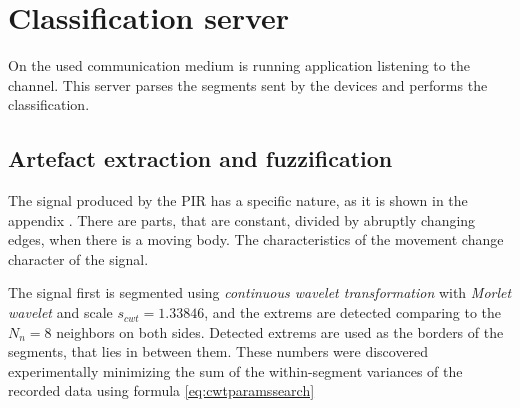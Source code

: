 



\section{Classification server}
On the used communication medium is running application listening to the channel.
This server parses the segments sent by the devices and performs the classification.


\subsection*{Artefact extraction and fuzzification}
The signal produced by the PIR has a specific nature, as it is shown in the appendix \label{appendix:PIRSignal}.
There are parts, that are constant, divided by abruptly changing edges, when there is a moving body. The
characteristics of the movement change character of the signal.

The signal first is segmented using {\it continuous wavelet transformation} with {\it Morlet wavelet}
and scale $s_{cwt} = 1.33846$, and the extrems are detected comparing to the $N_{n} = 8$ neighbors on both sides.
Detected extrems are used as the borders of the segments, that lies in between them. These numbers were
discovered experimentally minimizing the sum of the within-segment variances of the recorded data using formula \ref{eq:cwtparamssearch}

